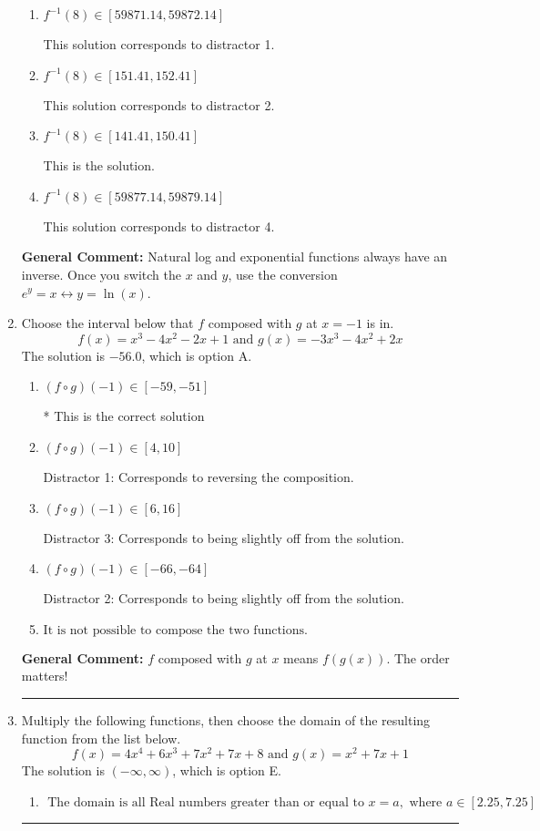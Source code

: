 \documentclass{extbook}[14pt]
\newcommand{\litem}[1]{\item #1

\rule{\textwidth}{0.4pt}}
\begin{document}
\begin{enumerate}
{\begin{enumerate}[label=\Alph*.]
 This solution corresponds to distractor 3.
\item \( f^{-1}(8) \in [59871.14, 59872.14] \)

 This solution corresponds to distractor 1.
\item \( f^{-1}(8) \in [151.41, 152.41] \)

 This solution corresponds to distractor 2.
\item \( f^{-1}(8) \in [141.41, 150.41] \)

 This is the solution.
\item \( f^{-1}(8) \in [59877.14, 59879.14] \)

 This solution corresponds to distractor 4.
\end{enumerate}

\textbf{General Comment:} Natural log and exponential functions always have an inverse. Once you switch the $x$ and $y$, use the conversion $ e^y = x \leftrightarrow y=\ln(x)$.
}
\litem{
Choose the interval below that $f$ composed with $g$ at $x=-1$ is in.
\[ f(x) = x^{3} -4 x^{2} -2 x + 1 \text{ and } g(x) = -3x^{3} -4 x^{2} +2 x \]The solution is \( -56.0 \), which is option A.\begin{enumerate}[label=\Alph*.]
\item \( (f \circ g)(-1) \in [-59, -51] \)

* This is the correct solution
\item \( (f \circ g)(-1) \in [4, 10] \)

 Distractor 1: Corresponds to reversing the composition.
\item \( (f \circ g)(-1) \in [6, 16] \)

 Distractor 3: Corresponds to being slightly off from the solution.
\item \( (f \circ g)(-1) \in [-66, -64] \)

 Distractor 2: Corresponds to being slightly off from the solution.
\item \( \text{It is not possible to compose the two functions.} \)


\end{enumerate}

\textbf{General Comment:} $f$ composed with $g$ at $x$ means $f(g(x))$. The order matters!
}
\litem{
Multiply the following functions, then choose the domain of the resulting function from the list below.
\[ f(x) = 4x^{4} +6 x^{3} +7 x^{2} +7 x + 8 \text{ and } g(x) = x^{2} +7 x + 1 \]The solution is \( (-\infty, \infty) \), which is option E.\begin{enumerate}[label=\Alph*.]
\item \( \text{ The domain is all Real numbers greater than or equal to } x = a, \text{ where } a \in [2.25, 7.25] \)



\end{enumerate}}
\end{enumerate}
\end{document}
